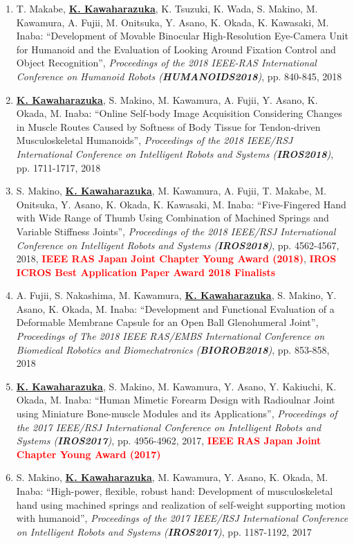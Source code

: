 \documentclass[letterpaper]{article}
\begin{document}
\begin{enumerate}
\item T. Makabe, \underline{\textbf{K. Kawaharazuka}}, K. Tsuzuki, K. Wada, S. Makino, M. Kawamura, A. Fujii, M. Onitsuka, Y. Asano, K. Okada, K. Kawasaki, M. Inaba: ``Development of Movable Binocular High-Resolution Eye-Camera Unit for Humanoid and the Evaluation of Looking Around Fixation Control and Object Recognition'', \textit{Proceedings of the 2018 IEEE-RAS International Conference on Humanoid Robots (\textit{\textbf{HUMANOIDS2018}})}, pp. 840-845, 2018
\item \underline{\textbf{K. Kawaharazuka}}, S. Makino, M. Kawamura, A. Fujii, Y. Asano, K. Okada, M. Inaba: ``Online Self-body Image Acquisition Considering Changes in Muscle Routes Caused by Softness of Body Tissue for Tendon-driven Musculoskeletal Humanoids'', \textit{Proceedings of the 2018 IEEE/RSJ International Conference on Intelligent Robots and Systems (\textit{\textbf{IROS2018}})}, pp. 1711-1717, 2018
\item S. Makino, \underline{\textbf{K. Kawaharazuka}}, M. Kawamura, A. Fujii, T. Makabe, M. Onitsuka, Y. Asano, K. Okada, K. Kawasaki, M. Inaba: ``Five-Fingered Hand with Wide Range of Thumb Using Combination of Machined Springs and Variable Stiffness Joints'', \textit{Proceedings of the 2018 IEEE/RSJ International Conference on Intelligent Robots and Systems (\textit{\textbf{IROS2018}})}, pp. 4562-4567, 2018, \textbf{\textcolor{red}{IEEE RAS Japan Joint Chapter Young Award (2018)}}, \textbf{\textcolor{red}{IROS ICROS Best Application Paper Award 2018 Finalists}}
\item A. Fujii, S. Nakashima, M. Kawamura, \underline{\textbf{K. Kawaharazuka}}, S. Makino, Y. Asano, K. Okada, M. Inaba: ``Development and Functional Evaluation of a Deformable Membrane Capsule for an Open Ball Glenohumeral Joint'', \textit{Proceedings of The 2018 IEEE RAS/EMBS International Conference on Biomedical Robotics and Biomechatronics (\textit{\textbf{BIOROB2018}})}, pp. 853-858, 2018
\item \underline{\textbf{K. Kawaharazuka}}, S. Makino, M. Kawamura, Y. Asano, Y. Kakiuchi, K. Okada, M. Inaba: ``Human Mimetic Forearm Design with Radioulnar Joint using Miniature Bone-muscle Modules and its Applications'', \textit{Proceedings of the 2017 IEEE/RSJ International Conference on Intelligent Robots and Systems (\textit{\textbf{IROS2017}})}, pp. 4956-4962, 2017, \textbf{\textcolor{red}{IEEE RAS Japan Joint Chapter Young Award (2017)}}
\item S. Makino, \underline{\textbf{K. Kawaharazuka}}, M. Kawamura, Y. Asano, K. Okada, M. Inaba: ``High-power, flexible, robust hand: Development of musculoskeletal hand using machined springs and realization of self-weight supporting motion with humanoid'', \textit{Proceedings of the 2017 IEEE/RSJ International Conference on Intelligent Robots and Systems (\textit{\textbf{IROS2017}})}, pp. 1187-1192, 2017

\end{enumerate}
\end{document}
